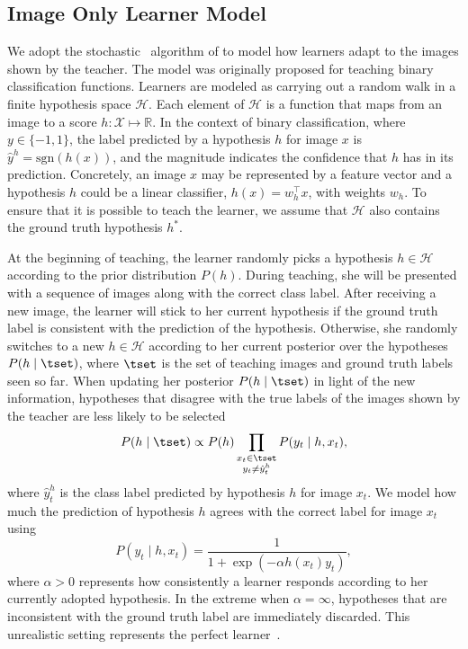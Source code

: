 \documentclass[../main.tex]{subfiles}
\begin{document}
\subsection{Image Only Learner Model}
We adopt the stochastic \STRICT~algorithm of \cite{singla2014near} to model how learners adapt to the images shown by the teacher.
The model was originally proposed for teaching binary classification functions. 
Learners are modeled as carrying out a random walk in a finite hypothesis space $\mathcal{H}$. 
Each element of $\mathcal{H}$ is a function that maps from an image to a score $h: \mathcal{X} \mapsto \mathbb{R}$.
In the context of binary classification, where $y \in \{-1, 1\}$, the label predicted by a hypothesis $h$ for image $x$ is $\hat{y}^h = \text{sgn}(h(x))$, and the magnitude indicates the confidence that $h$ has in its prediction.
Concretely, an image $x$ may be represented by a feature vector and a hypothesis $h$ could be a linear classifier, $h(x) = w_h^{\intercal}x$, with weights $w_h$.
To ensure that it is possible to teach the learner, we assume that $\mathcal{H}$ also contains the ground truth hypothesis $h^*$. 

At the beginning of teaching, the learner randomly picks a hypothesis $ h \in \mathcal{H}$ according to the prior distribution $P(h)$. 
During teaching, she will be presented with a sequence of images along with the correct class label. 
After receiving a new image, the learner will stick to her current hypothesis if the ground truth label is consistent with the prediction of the hypothesis.
Otherwise, she randomly switches to a new $ h \in \mathcal{H}$ according to her current posterior over the hypotheses $P(h\mid \tset)$, where $\tset$ is the set of teaching images and ground truth labels seen so far.
When updating her posterior $P(h\mid \tset)$ in light of the new information, hypotheses that disagree with the true labels of the images shown by the teacher are less likely to be selected 
\begin{align}
P(h\mid \tset) \propto P(h) \prod\limits_{\substack {x_t\in{} \tset\\y_t \neq \hat{y}^h_t}} P(y_t\mid h, x_t),
\label{equation:posterior}
\end{align}
where %
$\hat{y}^h_t$ is the class label predicted by hypothesis $h$ for image $x_t$.
We model how much the prediction of hypothesis $h$ agrees with the correct label for image $x_t$ using
\begin{equation}
    P(y_t\mid h, x_t) = \frac{1}{1 + \exp(-\alpha h(x_t)y_t)},
\end{equation}
where  $\alpha > 0$ represents how consistently a learner responds according to her currently adopted hypothesis. 
In the extreme when $\alpha = \infty$, hypotheses that are inconsistent with the ground truth label are immediately discarded.
This unrealistic setting represents the perfect learner~\cite{goldman1995complexity}.
\end{document}
